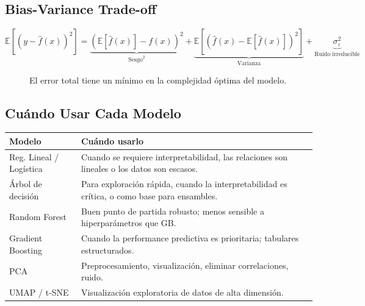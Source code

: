 \documentclass[12pt, a4paper]{article}
\newcommand{\E}{\mathbb{E}}
\begin{document}
\subsection{Bias-Variance Trade-off}

\[
  \E\!\left[(y - \hat{f}(x))^2\right]
  = \underbrace{\left(\E[\hat{f}(x)] - f(x)\right)^2}_{\text{Sesgo}^2}
  + \underbrace{\E\!\left[\left(\hat{f}(x) - \E[\hat{f}(x)]\right)^2\right]}_{\text{Varianza}}
  + \underbrace{\sigma^2_\varepsilon}_{\text{Ruido irreducible}}
\]

\begin{figure}[H]
\centering
{}
\caption{El error total tiene un mínimo en la complejidad óptima del modelo.}
\end{figure}

\subsection{Cuándo Usar Cada Modelo}

\begin{center}
\begin{tabular}{p{3.5cm}p{9cm}}
\toprule
\textbf{Modelo} & \textbf{Cuándo usarlo} \\
\midrule
Reg. Lineal / Logística &
  Cuando se requiere interpretabilidad, las relaciones son lineales
  o los datos son escasos. \\
Árbol de decisión &
  Para exploración rápida, cuando la interpretabilidad es crítica, o
  como base para ensambles. \\
Random Forest &
  Buen punto de partida robusto; menos sensible a hiperparámetros que GB. \\
Gradient Boosting &
  Cuando la performance predictiva es prioritaria; tabulares estructurados. \\
PCA &
  Preprocesamiento, visualización, eliminar correlaciones, ruido. \\
UMAP / t-SNE &
  Visualización exploratoria de datos de alta dimensión. \\
\bottomrule
\end{tabular}
\end{center}
\end{document}
